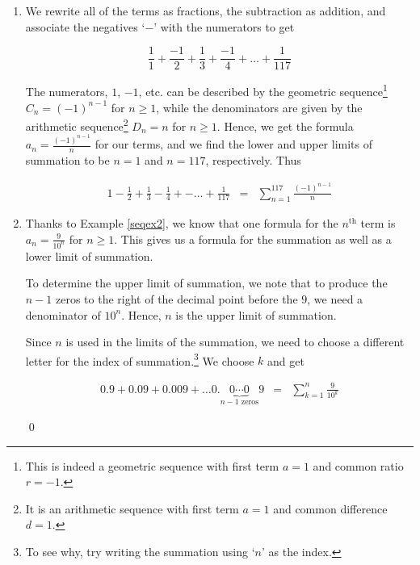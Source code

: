 \documentclass{ximera}
\begin{document}
\begin{example}
\begin{enumerate}
\begin{enumerate}
At this stage, we have the formula for the terms, namely $2n-1$, and the lower limit of the summation, $n=1$.  To finish the problem, we need to determine the upper limit of the summation.  In other words, we need to determine which value of $n$ produces the term $117$.  Setting $a_{n} = 117$, we get $2n-1=117$ or $n = 59$.  Our final answer is

\[ \begin{array}{rcl} 1 + 3 + 5 + \ldots + 117 & = & \displaystyle{\sum_{n=1}^{59} (2n-1)} \end{array} \]

\item We rewrite all of the terms as fractions, the subtraction as addition, and associate the negatives `$-$' with the numerators to get

\[ \frac{1}{1} + \frac{-1}{2} + \frac{1}{3} + \frac{-1}{4} + \ldots + \frac{1}{117}  \]

The numerators, $1$, $-1$, etc. can be described by the geometric sequence\footnote{This is indeed a geometric sequence with first term $a = 1$ and common ratio $r=-1$.} $C_{n} = (-1)^{n-1}$ for $n \geq 1$, while the denominators are given by the arithmetic sequence\footnote{It is an arithmetic sequence with first term $a=1$ and common difference $d=1$.} $D_{n} = n$ for $n \geq 1$.  Hence, we get the formula $a_{n} = \frac{(-1)^{n-1}}{n}$ for our terms, and we find the lower and upper limits of summation to be $n=1$ and  $n = 117$, respectively.  Thus

\[ \begin{array}{rcl} 1 - \frac{1}{2} + \frac{1}{3} - \frac{1}{4} + - \ldots + \frac{1}{117} & = & \displaystyle{\sum_{n=1}^{117} \frac{(-1)^{n-1}}{n}}   \end{array} \]

\item  Thanks to Example \ref{seqex2}, we know that one formula for the $n^{\text{th}}$ term is $a_{n} = \frac{9}{10^{n}}$ for $n \geq 1$.  This gives us a formula for the summation as well as a lower limit of summation.  

To determine the upper limit of summation, we note that to produce the $n-1$ zeros to the right of the decimal point before the $9$, we need a denominator of $10^{n}$.  Hence, $n$ is the upper limit of summation.  

Since $n$ is used in the limits of the summation, we need to choose a different letter for the index of summation.\footnote{To see why, try writing the summation using `$n$' as the index.}  We choose $k$ and get

  
\[ \begin{array}{rcl} 0.9 + 0.09 + 0.009 + \ldots 0.\!  \underbrace{0 \cdots 0}_{\text{$n-1$ zeros}} \!  9 & = & \displaystyle{\sum_{k=1}^{n} \frac{9}{10^{k}}} \end{array} \]

\qed

\end{enumerate}

\end{enumerate}
                    
\end{example}          
\end{document}
